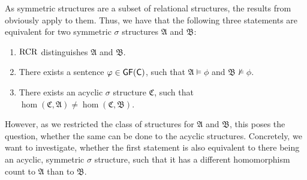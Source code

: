 As symmetric structures are a subset of relational structures, the results from \cite{scheidt2025ColorRefinement} obviously apply to them.
Thus, we have that the following three statements are equivalent for two symmetric $\sigma$ structures $\mathfrak A$ and $\mathfrak B$:
\begin{enumerate}
	\item $\operatorname{RCR}$ distinguishes $\mathfrak A$ and $\mathfrak B$.
	\item There exists a sentence $\varphi\in\mathsf{GF}(\mathsf{C})$, such that $\mathfrak A\models \phi$ and $\mathfrak B\not\models \phi$.
	\item There exists an acyclic $\sigma$ structure $\mathfrak C$, such that $\hom(\mathfrak C,\mathfrak A)\neq\hom(\mathfrak C,\mathfrak B)$.
\end{enumerate}
However, as we restricted the class of structures for $\mathfrak A$ and $\mathfrak B$, this poses the question, whether the same can be done to the acyclic structures.
Concretely, we want to investigate, whether the first statement is also equivalent to there being an acyclic, symmetric $\sigma$ structure, such that it has a different homomorphism count to $\mathfrak A$ than to $\mathfrak B$.

